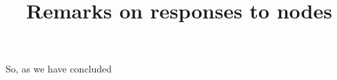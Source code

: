 \documentclass[a4paper,10pt]{article}
\title{Remarks on responses to nodes}
\author{}
\begin{document}
\maketitle

\begin{abstract}

\end{abstract}

\section{}

So, as we have concluded 
\end{document}
